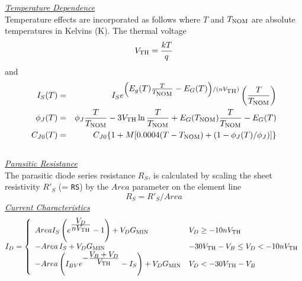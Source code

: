 \noindent\underline{\sl \large Temperature Dependence}
\\[0.1in]
Temperature effects are incorporated as follows where $T$ and $T_{\mbox{\scriptsize NOM}}$
are absolute temperatures in Kelvins (K).
The thermal voltage
\begin{equation}
V_{\mbox{\scriptsize TH}} = {{kT} \over q}\\
\end{equation}
and
\begin{eqnarray}
I_S (T) & = & I_S e^{\left( \textstyle E_g(T) {T \over {T_{\mbox{\scriptsize NOM}}}}
     - E_G(T) \right) /(nV_{\mbox{\scriptsize TH}})}
     \left({{\textstyle T} \over { \textstyle T_{\mbox{\scriptsize NOM}}}} \right)\\
\phi_J (T) & = & \phi_J {T \over {T_{\mbox{\scriptsize NOM}}}} - 3V_{\mbox{\scriptsize TH}} \ln{
                {T \over {T_{\mbox{\scriptsize NOM}}}} } + E_G (T_{\mbox{\scriptsize NOM}})
                {T \over {T_{\mbox{\scriptsize NOM}}}} -E_G(T)\\
C_{J0} (T) & = & C_{J0} \{1+M[0.0004(T-T_{\mbox{\scriptsize NOM}})+(1-\phi_J(T)/\phi_J)]\} \\
\end{eqnarray}\\[0.1in]
\noindent\underline{\sl \large Parasitic Resistance}\\[0.1in]
The parasitic diode series resistance $R_S$,
is calculated by scaling the sheet resistivity $R'_S$ (= {\tt RS})
by the $Area$ parameter on the element line
\begin{equation}
R_S = R'_S/Area
\end{equation}
\noindent\underline{\sl \large Current Characteristics}\\[0.1in]
\begin{equation}
I_D = \left\{ \begin{array}{ll}
      Area I_S
      \left( e^{{{\textstyle V_D}\over{\textstyle nV_{\ms{TH}}}}}
         -1 \right)
      +V_D\GMIN
      &  V_D \ge -10nV_{\ms{TH}} \\
      -Area\,I_S
      +V_D\GMIN
      & -30V_{\ms{TH}}-V_B \le V_D < -10nV_{\ms{TH}} \\
      -Area
      \left(I_{BV} e^{\textstyle -{{\textstyle V_B+V_D}\over{\textstyle V_{\ms{TH}}}}}
         -I_S \right)
      +V_D\GMIN
      &  V_D < -30V_{\ms{TH}}-V_B \\
      \end{array} \right. %
\end{equation}
